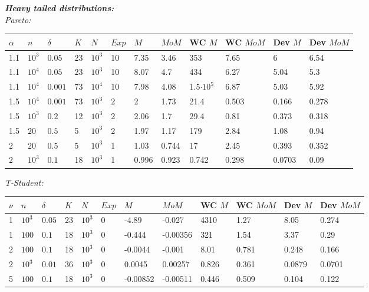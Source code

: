 \documentclass[11pt, english]{article}
\begin{document}
\textbf{\textit{Heavy tailed distributions:}}\\

\textit{Pareto:}

\begin{center}
	
	\begin{tabular}{|l|l|l|l|l|l||l|l|l|l|l|l|}
		\hline
		$\alpha$ & $n$ & $\delta$ & $K$ & $N$ & $Exp$ & $M$ & $MoM$ & WC $M$ & WC $MoM$ & Dev $M$ & Dev $MoM$ \\
		\hline\hline
		1.1 & $10^3$ &  $0.05$ & 23 & $10^3$ & 10 & 7.35 & 3.46 & 353 & 7.65 & 6 & 6.54\\
		\hline
		1.1 & $10^4$ &  $0.05$ & 23 & $10^3$ & 10 & 8.07 & 4.7 & 434 & 6.27 & 5.04 & 5.3\\
		\hline
		1.1 & $10^4$ &  $0.001$ & 73 & $10^4$ & 10 & 7.98 & 4.08 & 1.5$\cdot 10^5$ & 6.87 & 5.03 & 5.92\\
		\hline
		1.5 & $10^4$ &  $0.001$ & 73 & $10^3$ & 2 & 2 & 1.73 & 21.4 & 0.503 & 0.166 & 0.278\\
		\hline
		1.5 & $10^3$ &  $0.2$ & 12 & $10^3$ & 2 & 2.06 & 1.7 & 29.4 & 0.81
		& 0.373 & 0.318\\
		\hline
		1.5 & $20$ &  $0.5$ & 5 & $10^3$ & 2 & 1.97 & 1.17 & 179 & 2.84
		& 1.08 & 0.94\\
		\hline
		2 & $20$ &  $0.5$ & 5 & $10^3$ & 1 & 1.03 & 0.744 & 17 & 2.45
		& 0.393 & 0.352\\
		\hline
		2 & $10^3$ &  $0.1$ & 18 & $10^3$ & 1 & 0.996 & 0.923 & 0.742 & 0.298
		& 0.0703 & 0.09\\
		\hline
	\end{tabular}
	
\end{center}

\textit{T-Student:}

\begin{center}
	
	\begin{tabular}{|l|l|l|l|l|l||l|l|l|l|l|l|}
		\hline
		$\nu$ & $n$ & $\delta$ & $K$ & $N$ & $Exp$ & $M$ & $MoM$ & WC $M$ & WC $MoM$ & Dev $M$ & Dev $MoM$ \\
		\hline\hline
		1 & $10^3$ &  $0.05$ & 23 & $10^3$ & 0 & -4.89 & -0.027 & 4310 & 1.27 & 8.05 & 0.274\\
		\hline
		1 & $100$ &  $0.1$ & 18 & $10^3$ & 0 & -0.444 & -0.00356 & 321 & 1.54 & 3.37 & 0.29\\
		\hline
		2 & $100$ &  $0.1$ & 18 & $10^3$ & 0 & -0.0044 & -0.001 & 8.01 & 0.781 & 0.248 & 0.166\\
		\hline
		2 & $10^3$ &  $0.01$ & 36 & $10^3$ & 0 & 0.0045 & 0.00257 & 0.826 & 0.361 & 0.0879 & 0.0701\\
		\hline
		5 & $100$ &  $0.1$ & 18 & $10^3$ & 0 & -0.00852 & -0.00511 & 0.446 & 0.509
		& 0.104 & 0.122\\
		\hline
	\end{tabular}
	
\end{center}
\end{document}
